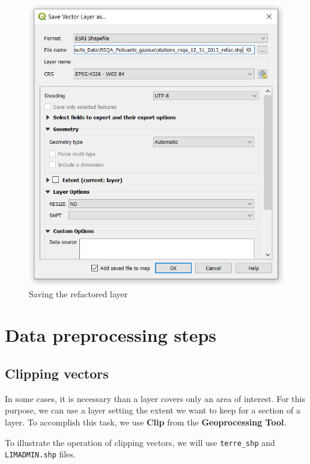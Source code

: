 \documentclass[]{book}
\theoremstyle{definition}
\theoremstyle{definition}
\theoremstyle{definition}
\theoremstyle{remark}
\begin{document}
\begin{figure}

{\centering \includegraphics[width=8.82in]{figures/Refactor_Dialog_Settings_2} 

}

\caption{Saving the refactored layer}\label{fig:unnamed-chunk-18}
\end{figure}

\chapter{Data preprocessing steps}\label{data-preprocessing-steps}

\section{Clipping vectors}\label{clipping-vectors}

In some cases, it is necessary than a layer covers only an area of
interest. For this purpose, we can use a layer setting the extent we
want to keep for a section of a layer. To accomplish this task, we use
\textbf{Clip} from the \textbf{Geoprocessing Tool}.

To illustrate the operation of clipping vectors, we will use
\texttt{terre\_shp} and \texttt{LIMADMIN.shp} files.
\end{document}
